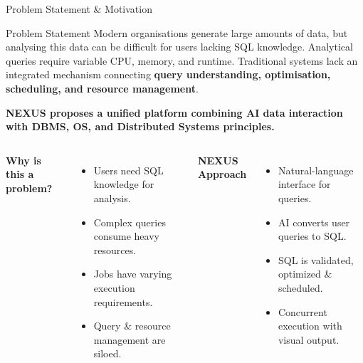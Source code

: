 \documentclass[aspectratio=169,11pt]{beamer}
\begin{document}

\begin{frame}{Problem Statement \& Motivation}

\begin{block}{Problem Statement}
\small
Modern organisations generate large amounts of data, but analysing this data can be difficult for users lacking SQL knowledge. Analytical queries require variable CPU, memory, and runtime. Traditional systems lack an integrated mechanism connecting \textbf{query understanding, optimisation, scheduling, and resource management}.

\textbf{NEXUS proposes a unified platform combining AI data interaction with DBMS, OS, and Distributed Systems principles.}
\end{block}

\vspace{1mm}

\begin{columns}[T,totalwidth=\textwidth]


\textbf{\color{GEUBlue}\small Why is this a problem?}
\begin{itemize}\itemsep1pt
\item[\tiny$\bullet$] \scriptsize Users need SQL knowledge for analysis.
\item[\tiny$\bullet$] \scriptsize Complex queries consume heavy resources.
\item[\tiny$\bullet$] \scriptsize Jobs have varying execution requirements.
\item[\tiny$\bullet$] \scriptsize Query \& resource management are siloed.
\end{itemize}


\textbf{\color{GEUBlue}\small NEXUS Approach}
\begin{itemize}\itemsep1pt
\item[\tiny$\bullet$] \scriptsize Natural-language interface for queries.
\item[\tiny$\bullet$] \scriptsize AI converts user queries to SQL.
\item[\tiny$\bullet$] \scriptsize SQL is validated, optimized \& scheduled.
\item[\tiny$\bullet$] \scriptsize Concurrent execution with visual output.
\end{itemize}

\end{columns}

\end{frame}
\end{document}
